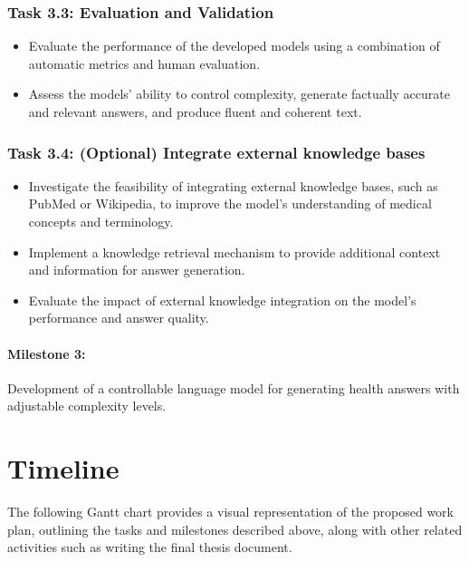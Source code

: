 \subsubsection*{Task 3.3: Evaluation and Validation}

\begin{itemize}
    \item Evaluate the performance of the developed models using a combination of automatic metrics and human evaluation.
    \item Assess the models' ability to control complexity, generate factually accurate and relevant answers, and produce fluent and coherent text.
\end{itemize}

\subsubsection*{Task 3.4: (Optional) Integrate external knowledge bases}

\begin{itemize}
    \item Investigate the feasibility of integrating external knowledge bases, such as PubMed or Wikipedia, to improve the model's understanding of medical concepts and terminology.
    \item Implement a knowledge retrieval mechanism to provide additional context and information for answer generation.
    \item Evaluate the impact of external knowledge integration on the model's performance and answer quality.
\end{itemize}

\paragraph{Milestone 3:} Development of a controllable language model for generating health answers with adjustable complexity levels.

\section{Timeline}

The following Gantt chart provides a visual representation of the proposed work plan, outlining the tasks and milestones described above, along with other related activities such as writing the final thesis document.

